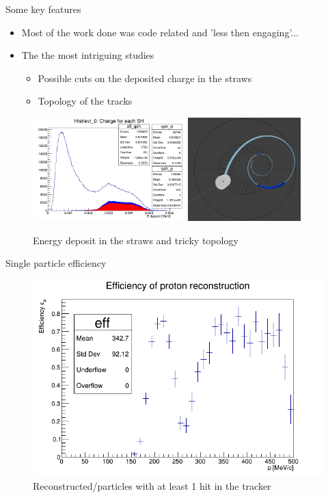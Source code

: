 \documentclass[10pt]{beamer}
\begin{document}
\begin{frame}{Some key features}
\begin{itemize}
\item Most of the work done was code related and 'less then engaging'...
\item The the most intriguing studies
\begin{itemize}
\item Possible cuts on the deposited charge in the straws
\item Topology of the tracks
\end{itemize} 
\end{itemize}
\begin{figure}
\includegraphics[height=4cm]{plots/mix/mix500_qsh}%
\includegraphics[height=4cm]{Blender_Tracker_4}%
\caption{Energy deposit in the straws and tricky topology}
\end{figure}
\end{frame}



\begin{frame}{Single particle efficiency}
\begin{figure}
\includegraphics[scale=0.4]{Report_3/pgun2_SHminE0_L_eff_genp3}
\caption{Reconstructed/particles with at least 1 hit in the tracker}
\end{figure}
\end{frame}
\end{document}
